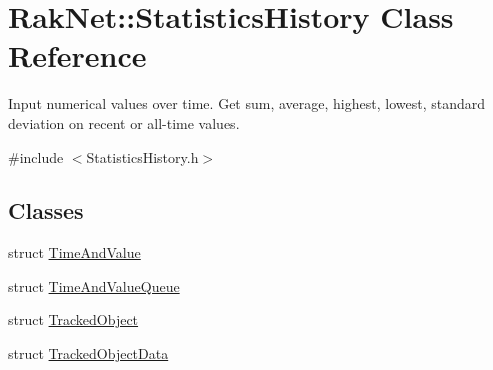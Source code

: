 \hypertarget{class_rak_net_1_1_statistics_history}{\section{Rak\-Net\-:\-:Statistics\-History Class Reference}
\label{class_rak_net_1_1_statistics_history}
}


Input numerical values over time. Get sum, average, highest, lowest, standard deviation on recent or all-\/time values.  




{\ttfamily \#include $<$Statistics\-History.\-h$>$}

\subsection*{Classes}
\begin{DoxyCompactItemize}
\item 
struct \hyperlink{struct_rak_net_1_1_statistics_history_1_1_time_and_value}{Time\-And\-Value}
\item 
struct \hyperlink{struct_rak_net_1_1_statistics_history_1_1_time_and_value_queue}{Time\-And\-Value\-Queue}
\item 
struct \hyperlink{struct_rak_net_1_1_statistics_history_1_1_tracked_object}{Tracked\-Object}
\item 
struct \hyperlink{struct_rak_net_1_1_statistics_history_1_1_tracked_object_data}{Tracked\-Object\-Data}
\end{DoxyCompactItemize}
